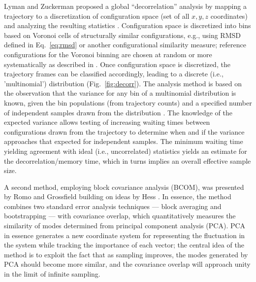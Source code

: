 Lyman and Zuckerman proposed a global ``decorrelation'' analysis by mapping a trajectory to a discretization of configuration space (set of all $x, y, z$ coordinates) and analyzing the resulting statistics \cite{Lyman2007a}.
Configuration space is discretized into bins based on Voronoi cells of structurally similar configurations,  e.g., using RMSD defined in Eq.\ \eqref{eq:rmsd} or another configurational similarity measure; reference configurations for the Voronoi binning are chosen at random or more systematically as described in \cite{Lyman2007a}.
Once configuration space is discretized, the trajectory frames can be classified accordingly, leading to a discrete (i.e., 'multinomial') distribution (Fig.\ \ref{fig:decorr}).
The analysis method is based on the observation that the variance for any bin of a multinomial distribution is known, given the bin populations (from trajectory counts) and a specified number of independent samples drawn from the distribution \cite{Lyman2007a}.
The knowledge of the expected variance allows testing of increasing waiting times between configurations drawn from the trajectory to determine when and if the variance approaches that expected for independent samples.
The minimum waiting time yielding agreement with ideal (i.e., uncorrelated) statistics yields an estimate for the decorrelation/memory time, which in turns implies an overall effective sample size. 



A second method, employing block covariance analysis (BCOM), was presented by Romo and Grossfield \cite{Romo2011} building on ideas by Hess \cite{Hess2002}.  In essence, the method combines two standard error analysis techniques --- block averaging \cite{Flyvbjerg-1989} and bootstrapping \cite{Tibshirani1998} --- with covariance overlap, which quantitatively measures the similarity of modes determined from principal component analysis (PCA)\cite{Hess2002}.  PCA in essence generates a new coordinate system for representing the fluctuation in the system while tracking the importance of each vector; the central idea of the method is to exploit the fact that as sampling improves, the modes generated by PCA should become more similar, and the covariance overlap will approach unity in the limit of infinite sampling.

